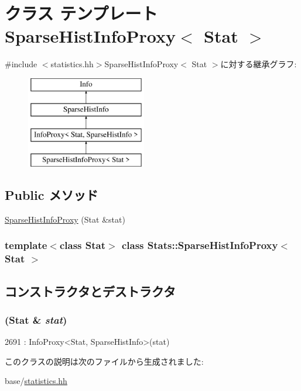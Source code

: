 \hypertarget{classStats_1_1SparseHistInfoProxy}{
\section{クラス テンプレート SparseHistInfoProxy$<$ Stat $>$}
\label{classStats_1_1SparseHistInfoProxy}
}


{\ttfamily \#include $<$statistics.hh$>$}SparseHistInfoProxy$<$ Stat $>$に対する継承グラフ:\begin{figure}[H]
\begin{center}
\leavevmode
\includegraphics[height=4cm]{classStats_1_1SparseHistInfoProxy}
\end{center}
\end{figure}
\subsection*{Public メソッド}
\begin{DoxyCompactItemize}
\item 
\hyperlink{classStats_1_1SparseHistInfoProxy_a09e5b5974abf9f372daf941dcc6dff43}{SparseHistInfoProxy} (Stat \&stat)
\end{DoxyCompactItemize}
\subsubsection*{template$<$class Stat$>$ class Stats::SparseHistInfoProxy$<$ Stat $>$}



\subsection{コンストラクタとデストラクタ}
\hypertarget{classStats_1_1SparseHistInfoProxy_a09e5b5974abf9f372daf941dcc6dff43}{
\subsubsection[{SparseHistInfoProxy}]{ (Stat \& {\em stat})}}
\label{classStats_1_1SparseHistInfoProxy_a09e5b5974abf9f372daf941dcc6dff43}



\begin{DoxyCode}
2691 : InfoProxy<Stat, SparseHistInfo>(stat) {}
\end{DoxyCode}


このクラスの説明は次のファイルから生成されました:\begin{DoxyCompactItemize}
\item 
base/\hyperlink{statistics_8hh}{statistics.hh}\end{DoxyCompactItemize}
